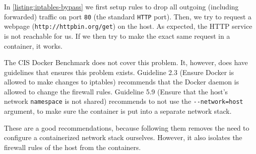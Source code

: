 In \autoref{listing:iptables-bypass} we first setup rules to drop all outgoing (including forwarded) traffic on port \lstinline{80} (the standard \lstinline{HTTP} port). Then, we try to request a webpage (\lstinline{http://httpbin.org/get}) on the host. As expected, the HTTP service is not reachable for us. If we then try to make the exact same request in a container, it works.

\medskip

The CIS Docker Benchmark does not cover this problem. It, however, does have guidelines that ensures this problem exists. Guideline 2.3 (Ensure Docker is allowed to make changes to iptables) recommends that the Docker daemon is allowed to change the firewall rules. Guideline 5.9 (Ensure that the host's network \lstinline{namespace} is not shared) recommends to not use the \lstinline{--network=host} argument, to make sure the container is put into a separate network stack. 

These are a good recommendations, because following them removes the need to configure a containerized network stack ourselves. However, it also isolates the firewall rules of the host from the containers.
